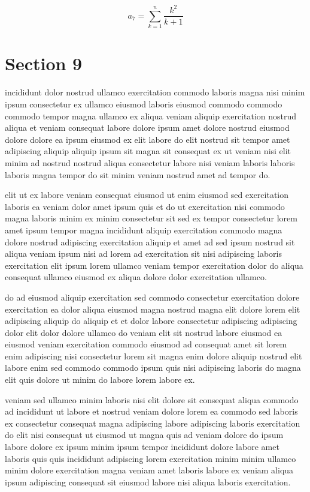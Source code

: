 \documentclass{article}
\begin{document}
\begin{equation} a_{7} = \sum_{k=1}^{n} \frac{k^2}{k+1} \end{equation}
\section{Section 9}
incididunt dolor nostrud ullamco exercitation commodo laboris magna nisi minim ipsum consectetur ex ullamco eiusmod laboris eiusmod commodo commodo commodo tempor magna ullamco ex aliqua veniam aliquip exercitation nostrud aliqua et veniam consequat labore dolore ipsum amet dolore nostrud eiusmod dolore dolore ea ipsum eiusmod ex elit labore do elit nostrud sit tempor amet adipiscing aliquip aliquip ipsum sit magna sit consequat ex ut veniam nisi elit minim ad nostrud nostrud aliqua consectetur labore nisi veniam laboris laboris laboris magna tempor do sit minim veniam nostrud amet ad tempor do.

elit ut ex labore veniam consequat eiusmod ut enim eiusmod sed exercitation laboris ea veniam dolor amet ipsum quis et do ut exercitation nisi commodo magna laboris minim ex minim consectetur sit sed ex tempor consectetur lorem amet ipsum tempor magna incididunt aliquip exercitation commodo magna dolore nostrud adipiscing exercitation aliquip et amet ad sed ipsum nostrud sit aliqua veniam ipsum nisi ad lorem ad exercitation sit nisi adipiscing laboris exercitation elit ipsum lorem ullamco veniam tempor exercitation dolor do aliqua consequat ullamco eiusmod ex aliqua dolore dolor exercitation ullamco.

do ad eiusmod aliquip exercitation sed commodo consectetur exercitation dolore exercitation ea dolor aliqua eiusmod magna nostrud magna elit dolore lorem elit adipiscing aliquip do aliquip et et dolor labore consectetur adipiscing adipiscing dolor elit dolor dolore ullamco do veniam elit sit nostrud labore eiusmod ea eiusmod veniam exercitation commodo eiusmod ad consequat amet sit lorem enim adipiscing nisi consectetur lorem sit magna enim dolore aliquip nostrud elit labore enim sed commodo commodo ipsum quis nisi adipiscing laboris do magna elit quis dolore ut minim do labore lorem labore ex.

veniam sed ullamco minim laboris nisi elit dolore sit consequat aliqua commodo ad incididunt ut labore et nostrud veniam dolore lorem ea commodo sed laboris ex consectetur consequat magna adipiscing labore adipiscing laboris exercitation do elit nisi consequat ut eiusmod ut magna quis ad veniam dolore do ipsum labore dolore ex ipsum minim ipsum tempor incididunt dolore labore amet laboris quis quis incididunt adipiscing lorem exercitation minim minim ullamco minim dolore exercitation magna veniam amet laboris labore ex veniam aliqua ipsum adipiscing consequat sit eiusmod labore nisi aliqua laboris exercitation.
\end{document}

